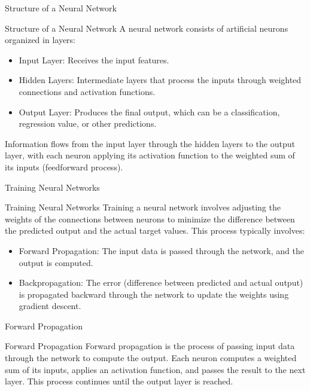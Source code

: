 \documentclass[hyperref={pdfpagelabels=false},aspectratio=169]{beamer}
\begin{document}
\begin{frame}[label={sec:orgb9a3bd7}]{Structure of a Neural Network}
\begin{block}{Structure of a Neural Network}
A neural network consists of artificial neurons organized in layers:
\begin{itemize}
\item \alert{Input Layer}: Receives the input features.
\item \alert{Hidden Layers}: Intermediate layers that process the inputs through weighted connections and activation functions.
\item \alert{Output Layer}: Produces the final output, which can be a classification, regression value, or other predictions.
\end{itemize}

Information flows from the input layer through the hidden layers to the output layer, with each neuron applying its activation function to the weighted sum of its inputs (\alert{feedforward} process).
\end{block}
\end{frame}
\begin{frame}[label={sec:orgf931a59}]{Training Neural Networks}
\begin{block}{Training Neural Networks}
Training a neural network involves adjusting the weights of the connections between neurons to minimize the difference between the predicted output and the actual target values. This process typically involves:
\begin{itemize}
\item \alert{Forward Propagation}: The input data is passed through the network, and the output is computed.
\item \alert{Backpropagation}: The error (difference between predicted and actual output) is propagated backward through the network to update the weights using gradient descent.
\end{itemize}
\end{block}
\end{frame}
\begin{frame}[label={sec:org3051d8f}]{Forward Propagation}
\begin{block}{Forward Propagation}
Forward propagation is the process of passing input data through the network to compute the output. Each neuron computes a weighted sum of its inputs, applies an activation function, and passes the result to the next layer. This process continues until the output layer is reached.
\end{block}
\end{frame}
\end{document}
